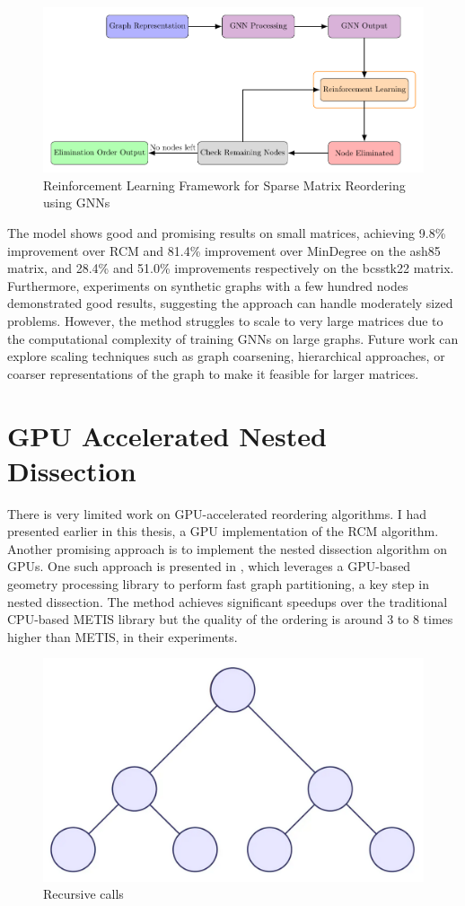 \begin{figure}[h]
    \centering
    \includegraphics[width=\textwidth]{fig/other/diagram.pdf}
    \caption{Reinforcement Learning Framework for Sparse Matrix Reordering using GNNs}
    \label{fig:rl_method}
\end{figure}

The model shows good and promising results on small matrices, achieving 9.8\% improvement over RCM and 81.4\% improvement over MinDegree on the ash85 matrix, and 28.4\% and 51.0\% improvements respectively on the bcsstk22 matrix. Furthermore, experiments on synthetic graphs with a few hundred nodes demonstrated good results, suggesting the approach can handle moderately sized problems. However, the method struggles to scale to very large matrices due to the computational complexity of training GNNs on large graphs. Future work can explore scaling techniques such as graph coarsening, hierarchical approaches, or coarser representations of the graph to make it feasible for larger matrices.

\section{GPU Accelerated Nested Dissection}

There is very limited work on GPU-accelerated reordering algorithms. I had presented earlier in this thesis, a GPU implementation of the RCM algorithm. Another promising approach is to implement the nested dissection algorithm on GPUs. One such approach is presented in \cite{yuan_fast_nodate}, which leverages a GPU-based geometry processing library to perform fast graph partitioning, a key step in nested dissection. The method achieves significant speedups over the traditional CPU-based METIS library but the quality of the ordering is around 3 to 8 times higher than METIS, in their experiments.

\begin{figure}
\centering
\includegraphics[width=0.3\linewidth]{fig/background/nested_dissection.png} 
\caption{Recursive calls}
\label{fig:nd_res}
\end{figure}


